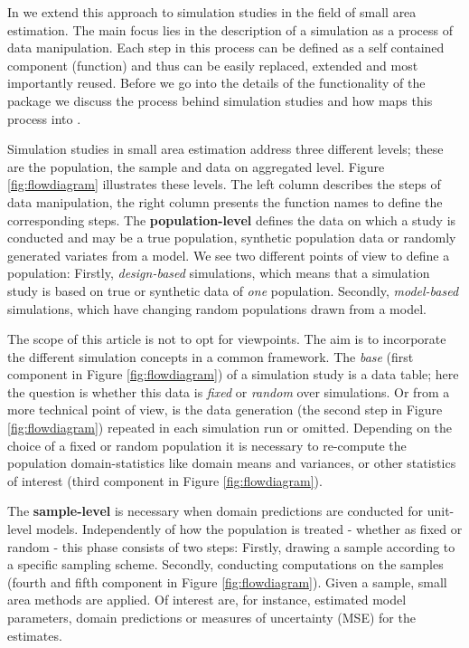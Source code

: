 \documentclass[article]{ajs}
\begin{document}
In  we extend this approach to simulation studies in the field of small area estimation. The main focus lies in the description of a simulation as a process of data manipulation. Each step in this process can be defined as a self contained component (function) and thus can be easily replaced, extended and most importantly reused. Before we go into the details of the functionality of the package we discuss the process behind simulation studies and how  maps this process into .

Simulation studies in small area estimation address three different levels; these are the population, the sample and data on aggregated level. Figure \ref{fig:flowdiagram} illustrates these levels. The left column describes the steps of data manipulation, the right column presents the function names to define the corresponding steps. The \textbf{population-level} defines the data on which a study is conducted and may be a true population, synthetic population data or randomly generated variates from a model. We see two different points of view to define a population: Firstly, \textit{design-based} simulations, which means that a simulation study is based on true or synthetic data of \textit{one} population. Secondly, \textit{model-based} simulations, which have changing random populations drawn from a model.

The scope of this article is not to opt for viewpoints. The aim is to incorporate the different simulation concepts in a common framework. The \textit{base} (first component in Figure \ref{fig:flowdiagram}) of a simulation study is a data table; here the question is whether this data is \textit{fixed} or \textit{random} over simulations. Or from a more technical point of view, is the data generation (the second step in Figure \ref{fig:flowdiagram}) repeated in each simulation run or omitted. Depending on the choice of a fixed or random population it is necessary to re-compute the population domain-statistics like domain means and variances, or other statistics of interest (third component in Figure \ref{fig:flowdiagram}).

The \textbf{sample-level} is necessary when domain predictions are conducted for unit-level models. Independently of how the population is treated - whether as fixed or random - this phase consists of two steps: Firstly, drawing a sample according to a specific sampling scheme. {Secondly, conducting} computations on the samples (fourth and fifth component in Figure \ref{fig:flowdiagram}). Given a sample, small area methods are applied. Of interest are, for instance, estimated model parameters, domain predictions or measures of uncertainty (MSE) for the estimates.
\end{document}
